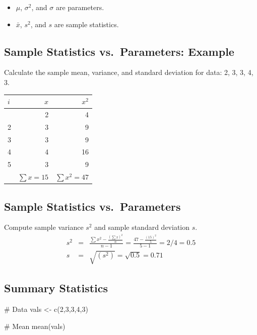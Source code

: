 \documentclass[
  letterpaper,
  DIV=11,
  numbers=noendperiod]{scrartcl}
\newenvironment{Shaded}{\begin{snugshade}}{\end{snugshade}}
\newcommand{\CommentTok}[1]{\textcolor[rgb]{0.37,0.37,0.37}{#1}}
\newcommand{\DecValTok}[1]{\textcolor[rgb]{0.68,0.00,0.00}{#1}}
\newcommand{\FunctionTok}[1]{\textcolor[rgb]{0.28,0.35,0.67}{#1}}
\newcommand{\NormalTok}[1]{\textcolor[rgb]{0.00,0.23,0.31}{#1}}
\newcommand{\OtherTok}[1]{\textcolor[rgb]{0.00,0.23,0.31}{#1}}
\begin{document}
\begin{itemize}
\item
  \(\mu\), \(\sigma^2\), and \(\sigma\) are {parameters}.
\item
  \(\bar{x}\), \(s^2\), and \(s\) are {sample statistics}.
\end{itemize}

\subsection{Sample Statistics vs.~Parameters:
Example}\label{sample-statistics-vs.-parameters-example}

Calculate the sample mean, variance, and standard deviation for data: 2,
3, 3, 4, 3.

\begin{longtable}[]{@{}lrr@{}}
\toprule\noalign{}
\(i\) & \(x\) & \(x^2\) \\
\midrule\noalign{}
\endhead
\bottomrule\noalign{}
\endlastfoot
1 & 2 & 4 \\
2 & 3 & 9 \\
3 & 3 & 9 \\
4 & 4 & 16 \\
5 & 3 & 9 \\
& \(\sum x=15\) & \(\sum x^2= 47\) \\
\end{longtable}

\subsection{Sample Statistics
vs.~Parameters}\label{sample-statistics-vs.-parameters-3}

Compute sample variance \(s^2\) and sample standard deviation \(s\).
\[\begin{eqnarray*}
s^2 & = &\frac{\textstyle\sum x^2 - \frac{(\textstyle\sum
x)^2}{n}}{n-1}=\frac{47-\frac{(15)^2}{5}}{5-1}=2/4=0.5\\[.1in]
 s & = & \sqrt{(s^2)}=\sqrt{0.5}=0.71
\end{eqnarray*}\]

\subsection{Summary Statistics}\label{summary-statistics}

\begin{Shaded}
\begin{Highlighting}[]
\CommentTok{\# Data}
\NormalTok{vals }\OtherTok{\textless{}{-}} \FunctionTok{c}\NormalTok{(}\DecValTok{2}\NormalTok{,}\DecValTok{3}\NormalTok{,}\DecValTok{3}\NormalTok{,}\DecValTok{4}\NormalTok{,}\DecValTok{3}\NormalTok{)}

\CommentTok{\# Mean}
\FunctionTok{mean}\NormalTok{(vals)}
\end{Highlighting}
\end{Shaded}
\end{document}
